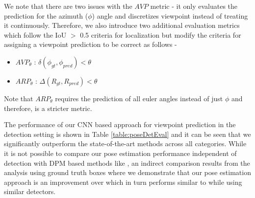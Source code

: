 We note that there are two issues with the $AVP$ metric - it only evaluates the prediction for the azimuth ($\phi$) angle and discretizes viewpoint instead of treating it continuously. Therefore, we also introduce two additional evaluation metrics which follow the IoU $>$ 0.5 criteria for localization but modify the criteria for assigning a viewpoint prediction to be correct as follows -
\begin{itemize}
\item $AVP_{\theta}$ : $\delta(\phi_{gt},\phi_{pred})<\theta$
\item $ARP_{\theta}$ :  $\Delta(R_{gt},R_{pred})<\theta$
\end{itemize}
Note that $ARP_{\theta}$ requires the prediction of all euler angles instead of just $\phi$ and therefore, is a stricter metric.

The performance of our CNN based approach for viewpoint prediction in the detection setting is shown in Table \ref{table:poseDetEval} and it can be seen that we significantly outperform the state-of-the-art methods across all categories. While it is not possible to compare our pose estimation performance independent of detection with DPM based methods like \cite{pascal3d,pepik12dpm}, an indirect comparison results from the analysis using ground truth boxes where we demonstrate that our pose estimation approach is an improvement over \cite{ghodrati14viewpoint} which in turn performs similar to \cite{pascal3d,pepik12dpm} while using similar detectors.
